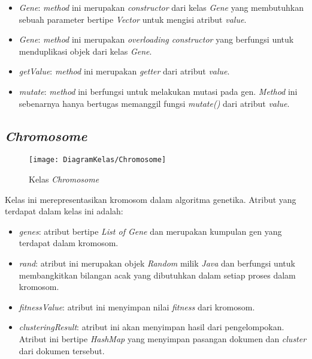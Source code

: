 \begin{itemize}
	\item \textit{Gene}: \textit{method} ini merupakan \textit{constructor} dari kelas \textit{Gene} yang membutuhkan sebuah parameter bertipe \textit{Vector} untuk mengisi atribut \textit{value}.
	\item \textit{Gene}: \textit{method} ini merupakan \textit{overloading constructor} yang berfungsi untuk menduplikasi objek dari kelas \textit{Gene}.
	\item \textit{getValue}: \textit{method} ini merupakan \textit{getter} dari atribut \textit{value}.
	\item \textit{mutate}: \textit{method} ini berfungsi untuk melakukan mutasi pada gen. \textit{Method} ini sebenarnya hanya bertugas memanggil fungsi \textit{mutate()} dari atribut \textit{value}.
\end{itemize}

\subsection{\textit{Chromosome}}

\begin{figure}[H]
	\begin{center}
		\texttt{[image: DiagramKelas/Chromosome]}
		\caption{Kelas \textit{Chromosome}}
		\label{fig:kelasChromosome}
	\end{center}
\end{figure}

Kelas ini merepresentasikan kromosom dalam algoritma genetika. Atribut yang terdapat dalam kelas ini adalah:

\begin{itemize}
	\item \textit{genes}: atribut bertipe \textit{List of Gene} dan merupakan kumpulan gen yang terdapat dalam kromosom.
	\item \textit{rand}: atribut ini merupakan objek \textit{Random} milik \textit{Java} dan berfungsi untuk membangkitkan bilangan acak yang dibutuhkan dalam setiap proses dalam kromosom.
	\item \textit{fitnessValue}: atribut ini menyimpan nilai \textit{fitness} dari kromosom.
	\item \textit{clusteringResult}: atribut ini akan menyimpan hasil dari pengelompokan. Atribut ini bertipe \textit{HashMap} yang menyimpan pasangan dokumen dan \textit{cluster} dari dokumen tersebut.
\end{itemize}

